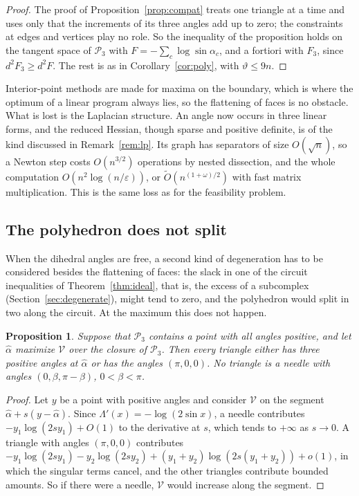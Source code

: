 \documentclass[11pt]{amsart}
\newtheorem{proposition}[theorem]{Proposition}
\theoremstyle{definition}
\theoremstyle{remark}
\newcommand{\Ot}{\widetilde{O}}
\newcommand{\eps}{\varepsilon}
\begin{document}
\begin{proof}
The proof of Proposition~\ref{prop:compat} treats one triangle at a time and uses only that the increments of its three angles add up to zero; the constraints at edges and vertices play no role. So the inequality of the proposition holds on the tangent space of $\mathcal P_3$ with $F=-\sum_c\log\sin\alpha_c$, and a fortiori with $F_3$, since $d^2F_3\ge d^2F$.
The rest is as in Corollary~\ref{cor:poly}, with $\vartheta\le9n$.
\end{proof}

Interior-point methods are made for maxima on the boundary, which is where the optimum of a linear program always lies, so the flattening of faces is no obstacle. What is lost is the Laplacian structure. An angle now occurs in three linear forms, and the reduced Hessian, though sparse and positive definite, is of the kind discussed in Remark~\ref{rem:lp}.
Its graph has separators of size $O(\sqrt n)$, so a Newton step costs $O(n^{3/2})$ operations by nested dissection, and the whole computation $O(n^2\log(n/\eps))$, or $\Ot(n^{(1+\omega)/2})$ with fast matrix multiplication. This is the same loss as for the feasibility problem.

\subsection{The polyhedron does not split}
When the dihedral angles are free, a second kind of degeneration has to be considered besides the flattening of faces: the slack in one of the circuit inequalities of Theorem~\ref{thm:ideal}, that is, the excess of a subcomplex (Section~\ref{sec:degenerate}), might tend to zero, and the polyhedron would split in two along the circuit. At the maximum this does not happen.

\begin{proposition}\label{prop:nosplit}
Suppose that $\mathcal P_3$ contains a point with all angles positive, and let $\hat\alpha$ maximize $\mathcal V$ over the closure of $\mathcal P_3$. Then every triangle either has three positive angles at $\hat\alpha$ or has the angles $(\pi,0,0)$. No triangle is a needle with angles $(0,\beta,\pi-\beta)$, $0<\beta<\pi$.
\end{proposition}

\begin{proof}
Let $y$ be a point with positive angles and consider $\mathcal V$ on the segment $\hat\alpha+s(y-\hat\alpha)$. Since $\Lambda'(x)=-\log(2\sin x)$, a needle contributes $-y_1\log(2sy_1)+O(1)$ to the derivative at $s$, which tends to $+\infty$ as $s\to0$. A triangle with angles $(\pi,0,0)$ contributes
$-y_1\log(2sy_1)-y_2\log(2sy_2)+(y_1+y_2)\log(2s(y_1+y_2))+o(1)$, in which the singular terms cancel, and the other triangles contribute bounded amounts. So if there were a needle, $\mathcal V$ would increase along the segment.
\end{proof}
\end{document}
